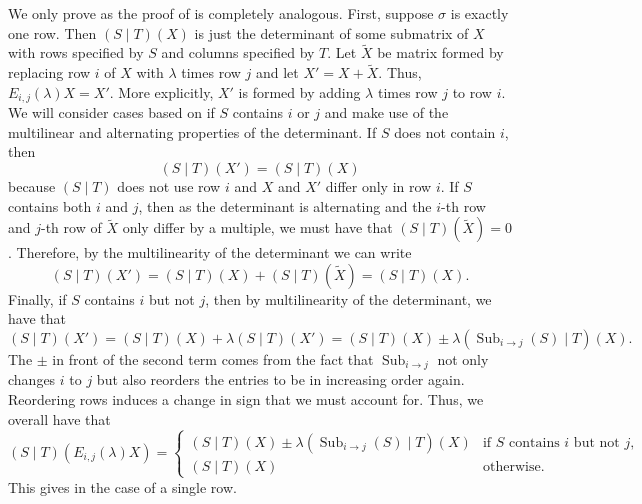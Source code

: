 \documentclass[10pt,a4paper]{amsart}
\DeclareMathOperator{\Sub}{Sub}
\begin{document}
\begin{pf}
    We only prove  as the proof of  is completely analogous.
    First, suppose $\sigma$ is exactly one row.
    Then $(S \mid T)(X)$ is just the determinant of some submatrix of $X$ with rows specified by $S$ and columns specified by $T$.
    Let $\widetilde{X}$ be matrix formed by replacing row $i$ of $X$ with $\lambda$ times row $j$ and let $X' = X + \widetilde{X}$.
    Thus, $E_{i, j}(\lambda)X = X'$.
    More explicitly, $X'$ is formed by adding $\lambda$ times row $j$ to row $i$.
    We will consider cases based on if $S$ contains $i$ or $j$ and make use of the multilinear and alternating properties of the determinant.
    If $S$ does not contain $i$, then
    \[
        (S \mid T)(X') = (S \mid T)(X)
    \]
    because $(S \mid T)$ does not use row $i$ and $X$ and $X'$ differ only in row $i$.
    If $S$ contains both $i$ and $j$, then as the determinant is alternating and the $i$-th row and $j$-th row of $\widetilde{X}$ only differ by a multiple, we must have that $(S \mid T)(\widetilde{X}) = 0$.
    Therefore, by the multilinearity of the determinant we can write
    \[
        (S \mid T)(X') = (S \mid T)(X) + (S \mid T)(\widetilde{X}) = (S \mid T)(X).
    \]
    Finally, if $S$ contains $i$ but not $j$, then by multilinearity of the determinant, we have that
    \[
        (S \mid T)(X') = (S \mid T)(X) + \lambda(S \mid T)(X') = (S \mid T)(X) \pm \lambda(\Sub_{i \to j}(S) \mid T)(X).
    \]
    The $\pm$ in front of the second term comes from the fact that $\Sub_{i \to j}$ not only changes $i$ to $j$ but also reorders the entries to be in increasing order again.
    Reordering rows induces a change in sign that we must account for.
    Thus, we overall have that
    \begin{equation}\label{eq:Eij_left_mult_cases}
        (S \mid T)(E_{i, j}(\lambda)X) = 
            \begin{cases}
                (S \mid T)(X) \pm \lambda(\Sub_{i \to j}(S) \mid T)(X) & \text{if } S \text{ contains } i \text{ but not } j, \\
                (S \mid T)(X) & \text{otherwise}.
            \end{cases}
    \end{equation}
    This gives  in the case of a single row.
    

\end{pf}
\end{document}
